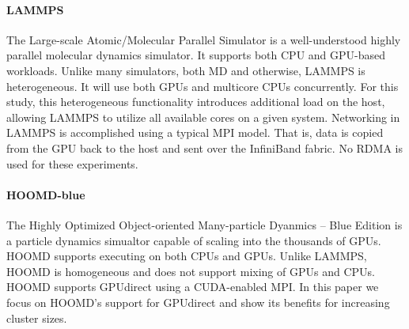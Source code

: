 \paragraph {LAMMPS} The Large-scale Atomic/Molecular Parallel Simulator is a
well-understood highly parallel molecular dynamics simulator.  It supports both
CPU and GPU-based workloads.  Unlike many simulators, both MD and otherwise,
LAMMPS is heterogeneous.  It will use both GPUs and multicore CPUs concurrently.
For this study, this heterogeneous functionality introduces additional load on
the host, allowing LAMMPS to utilize all available cores on a given system.
Networking in LAMMPS is accomplished using a typical MPI model. That is, data is
copied from the GPU back to the host and sent over the InfiniBand fabric.  No
RDMA is used for these experiments.  

\paragraph{HOOMD-blue} The Highly Optimized Object-oriented Many-particle
Dyanmics -- Blue Edition is a particle dynamics simualtor capable of
scaling into the thousands of GPUs.  HOOMD supports executing on both CPUs and
GPUs.  Unlike LAMMPS, HOOMD is homogeneous and does not support mixing
of GPUs and CPUs.  HOOMD supports GPUdirect using a CUDA-enabled MPI.
In this paper we focus on HOOMD's
support for GPUdirect and show its benefits for increasing cluster sizes.  


